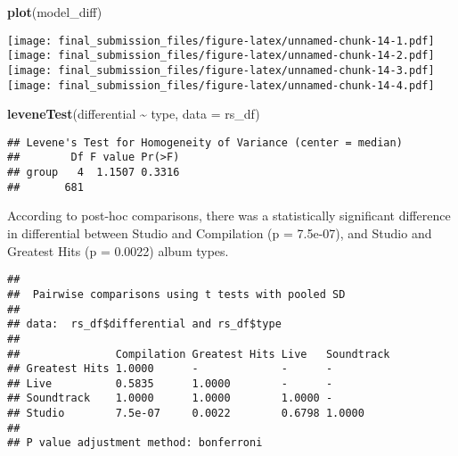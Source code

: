 \documentclass[
]{article}
\newenvironment{Shaded}{\begin{snugshade}}{\end{snugshade}}
\newcommand{\AttributeTok}[1]{\textcolor[rgb]{0.13,0.29,0.53}{#1}}
\newcommand{\FunctionTok}[1]{\textcolor[rgb]{0.13,0.29,0.53}{\textbf{#1}}}
\newcommand{\NormalTok}[1]{#1}
\newcommand{\SpecialCharTok}[1]{\textcolor[rgb]{0.81,0.36,0.00}{\textbf{#1}}}
\newcommand{\StringTok}[1]{\textcolor[rgb]{0.31,0.60,0.02}{#1}}
\begin{document}
\begin{Shaded}
\begin{Highlighting}[]
\FunctionTok{plot}\NormalTok{(model\_diff)}
\end{Highlighting}
\end{Shaded}

\texttt{[image: final\_submission\_files/figure-latex/unnamed-chunk-14-1.pdf]}
\texttt{[image: final\_submission\_files/figure-latex/unnamed-chunk-14-2.pdf]}
\texttt{[image: final\_submission\_files/figure-latex/unnamed-chunk-14-3.pdf]}
\texttt{[image: final\_submission\_files/figure-latex/unnamed-chunk-14-4.pdf]}

\begin{Shaded}
\begin{Highlighting}[]
\FunctionTok{leveneTest}\NormalTok{(differential }\SpecialCharTok{\textasciitilde{}}\NormalTok{ type, }\AttributeTok{data =}\NormalTok{ rs\_df)}
\end{Highlighting}
\end{Shaded}

\begin{verbatim}
## Levene's Test for Homogeneity of Variance (center = median)
##        Df F value Pr(>F)
## group   4  1.1507 0.3316
##       681
\end{verbatim}

According to post-hoc comparisons, there was a statistically significant
difference in differential between Studio and Compilation (p = 7.5e-07),
and Studio and Greatest Hits (p = 0.0022) album types.

\begin{Shaded}
\end{Shaded}

\begin{verbatim}
## 
##  Pairwise comparisons using t tests with pooled SD 
## 
## data:  rs_df$differential and rs_df$type 
## 
##               Compilation Greatest Hits Live   Soundtrack
## Greatest Hits 1.0000      -             -      -         
## Live          0.5835      1.0000        -      -         
## Soundtrack    1.0000      1.0000        1.0000 -         
## Studio        7.5e-07     0.0022        0.6798 1.0000    
## 
## P value adjustment method: bonferroni
\end{verbatim}
\end{document}
